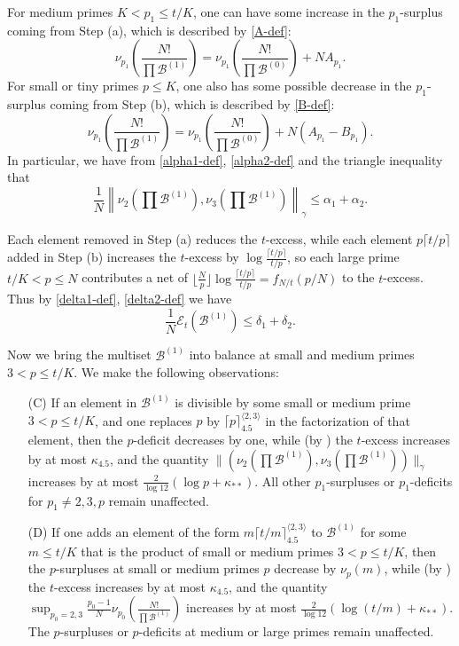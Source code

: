 \documentclass[12pt,a4paper,reqno]{amsart}
\numberwithin{equation}{section}
\theoremstyle{plain}
\theoremstyle{definition}
\newcommand\tuple{{\mathcal B}}
\newcommand\excess{{\mathcal{E}}}
\begin{document}
For medium primes $K < p_1 \leq t/K$, one can have some increase in the $p_1$-surplus coming from Step (a), which is described by \eqref{A-def}:
$$ \nu_{p_1}\left(\frac{N!}{\prod \tuple^{(1)}}\right) = \nu_{p_1}\left(\frac{N!}{\prod \tuple^{(0)}}\right) + NA_{p_1}.$$
For small or tiny primes $p \leq K$, one also has some possible decrease in the $p_1$-surplus coming from Step (b), which is described by \eqref{B-def}:
$$ \nu_{p_1}\left(\frac{N!}{\prod \tuple^{(1)}}\right) = \nu_{p_1}\left(\frac{N!}{\prod \tuple^{(0)}}\right) + N(A_{p_1} - B_{p_1}).$$
In particular, we have from \eqref{alpha1-def}, \eqref{alpha2-def} and the triangle inequality that
\begin{equation}\label{alpha-1}
\frac{1}{N} \left\| \nu_2\left(\prod \tuple^{(1)}\right), \nu_3\left(\prod \tuple^{(1)}\right)\right\|_\gamma \leq \alpha_1 + \alpha_2.
\end{equation}

Each element removed in Step (a) reduces the $t$-excess, while each element $p \lceil t/p \rceil$ added in Step (b) increases the $t$-excess by $\log \frac{\lceil t/p \rceil}{t/p}$, so each large prime $t/K < p \leq N$ contributes a net of $\lfloor \frac{N}{p} \rfloor \log \frac{\lceil t/p \rceil}{t/p} = f_{N/t}(p/N)$ to the $t$-excess.  Thus by \eqref{delta1-def}, \eqref{delta2-def} we have
\begin{equation}\label{excess-1} 
  \frac{1}{N} \excess_t(\tuple^{(1)}) \leq \delta_1 + \delta_2.
\end{equation}

Now we bring the multiset $\tuple^{(1)}$ into balance at small and medium primes $3 < p \leq t/K$.  We make the following observations:
\begin{itemize}
\item[(C)]  If an element in $\tuple^{(1)}$ is divisible by some small or medium prime $3 < p \leq t/K$, and one replaces $p$ by $\lceil p \rceil^{\langle 2,3 \rangle}_{4.5}$ in the factorization of that element, then the $p$-deficit decreases by one, while (by ) the $t$-excess increases by at most $\kappa_{4.5}$, and the quantity $\| (\nu_2(\prod \tuple^{(1)}),\nu_3(\prod \tuple^{(1)}))\|_\gamma$ increases by at most $\frac{2}{\log 12}(\log p + \kappa_{**})$.  All other $p_1$-surpluses or $p_1$-deficits for $p_1 \neq 2,3,p$ remain unaffected.
\item[(D)]  If one adds an element of the form $m \lceil t/m \rceil^{\langle 2,3 \rangle}_{4.5}$ to $\tuple^{(1)}$ for some $m \leq t/K$ that is the product of small or medium primes $3 < p \leq t/K$, then the $p$-surpluses at small or medium primes $p$ decrease by $\nu_p(m)$, while (by ) the $t$-excess increases by at most $\kappa_{4.5}$, and the quantity $\sup_{p_0=2,3} \frac{p_0-1}{N} \nu_{p_0}\left(\frac{N!}{\prod \tuple^{(1)}}\right)$ increases by at most $\frac{2}{\log 12}(\log(t/m) + \kappa_{**})$.  The $p$-surpluses or $p$-deficits at medium or large primes remain unaffected.
\end{itemize}
\end{document}
